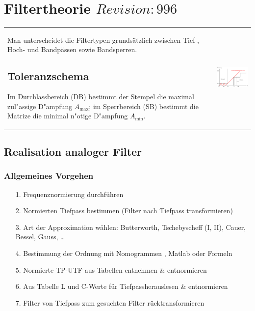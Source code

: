 \section{Filtertheorie  \tiny{$Revision: 996 $}}
\begin{tabular}{ll}
\parbox{12cm}{
	Man unterscheidet die Filtertypen grundsätzlich zwischen
	Tief-, Hoch- und Bandpässen sowie Bandsperren.
	
	\subsection{Toleranzschema }
	Im Durchlassbereich (DB) bestimmt der Stempel die maximal zul"assige D"ampfung
	$A_{\max}$; im Sperrbereich (SB) bestimmt die Matrize die minimal n"otige
	D"ampfung $A_{\min}$.
	}
& \parbox{6cm}{
	\includegraphics[width=6cm]{./bilder/filter-toleranzschema.png}}
\end{tabular}

\subsection{Realisation analoger Filter}
\subsubsection{Allgemeines Vorgehen}
\begin{itemize}
  \item[1.] Frequenznormierung durchführen
  \item[2.] Normierten Tiefpass bestimmen (Filter nach Tiefpass transformieren)
  \item[3.] Art der Approximation wählen: Butterworth, Tschebyscheff (I, II),
  Cauer, Bessel, Gauss, \ldots
  \item[4.] Bestimmung der Ordnung mit Nomogrammen , Matlab
	 oder Formeln
  \item[5.] Normierte TP-UTF aus Tabellen entnehmen \& entnormieren
  \item[6.] Aus Tabelle  L und C-Werte für Tiefpassherauslesen
  \& entnormieren
  \item[7.] Filter von Tiefpass zum gesuchten Filter rücktransformieren
\end{itemize}


